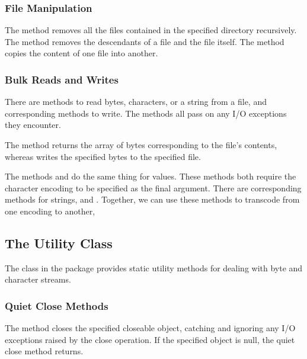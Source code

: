 \subsubsection{File Manipulation}

The method  removes all the files
contained in the specified directory recursively.  The
 method removes the descendants of a file
and the file itself.  The  method
copies the content of one file into another.

\subsubsection{Bulk Reads and Writes}

There are methods to read bytes, characters, or a string from a file,
and corresponding methods to write.  The methods all pass on any I/O
exceptions they encounter.

The method  returns the array of bytes
corresponding to the file's contents, whereas
 writes the specified bytes to the
specified file.

The methods  and
 do the same thing for
 values.  These methods both require the character encoding
to be specified as the final argument.  There are corresponding
methods for strings,  and
.  Together, we can
use these methods to transcode from one encoding to another,
%


\subsection{The  Utility Class}

The class  in the package  provides
static utility methods for dealing with byte and character streams.  

\subsubsection{Quiet Close Methods}

The method  closes the specified
closeable object, catching and ignoring any I/O exceptions raised
by the close operation.  If the specified object is null, the
quiet close method returns.

